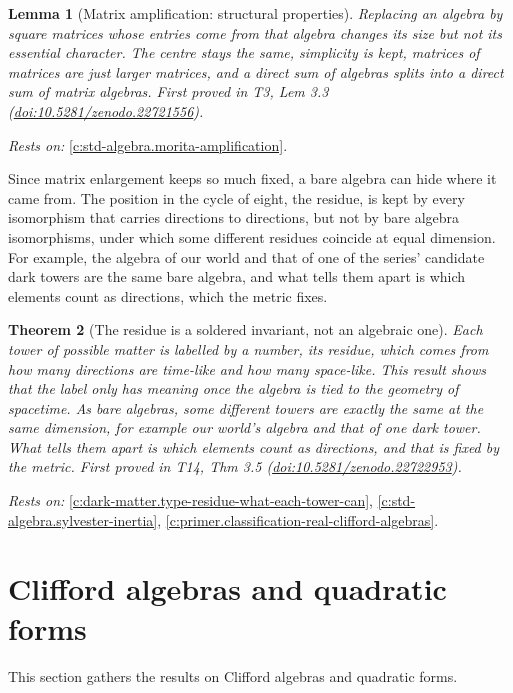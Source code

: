 \documentclass[11pt]{article}
\newtheorem{theorem}{Theorem}[section]
\newtheorem{lemma}[theorem]{Lemma}
\theoremstyle{definition}
\theoremstyle{plain}
\begin{document}
\begin{lemma}[Matrix amplification: structural properties]\label{c:tower.matrix-amplification-structural-properties}
Replacing an algebra by square matrices whose entries come from that algebra changes its size but not its essential character. The centre stays the same, simplicity is kept, matrices of matrices are just larger matrices, and a direct sum of algebras splits into a direct sum of matrix algebras.
\emph{First proved in} T3, Lem 3.3 (\href{https://doi.org/10.5281/zenodo.22721556}{doi:10.5281/zenodo.22721556}).
\end{lemma}
\noindent\emph{Rests on:} \ref{c:std-algebra.morita-amplification}.

Since matrix enlargement keeps so much fixed, a bare algebra can hide where it came from. The position in the cycle of eight, the residue, is kept by every isomorphism that carries directions to directions, but not by bare algebra isomorphisms, under which some different residues coincide at equal dimension. For example, the algebra of our world and that of one of the series' candidate dark towers are the same bare algebra, and what tells them apart is which elements count as directions, which the metric fixes.

\begin{theorem}[The residue is a soldered invariant, not an algebraic one]\label{c:dark-matter.residue-soldered-invariant-not-algebraic-one}
Each tower of possible matter is labelled by a number, its residue, which comes from how many directions are time-like and how many space-like. This result shows that the label only has meaning once the algebra is tied to the geometry of spacetime. As bare algebras, some different towers are exactly the same at the same dimension, for example our world's algebra and that of one dark tower. What tells them apart is which elements count as directions, and that is fixed by the metric.
\emph{First proved in} T14, Thm 3.5 (\href{https://doi.org/10.5281/zenodo.22722953}{doi:10.5281/zenodo.22722953}).
\end{theorem}
\noindent\emph{Rests on:} \ref{c:dark-matter.type-residue-what-each-tower-can}, \ref{c:std-algebra.sylvester-inertia}, \ref{c:primer.classification-real-clifford-algebras}.

\section{Clifford algebras and quadratic forms}

This section gathers the results on Clifford algebras and quadratic forms.
\end{document}
